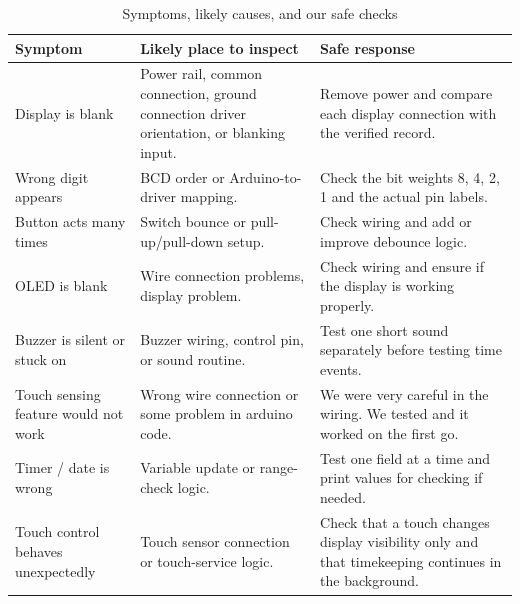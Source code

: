 \documentclass[12pt,letterpaper]{article}
\begin{document}
\begin{table}[H]

  \centering

  \caption{
  Symptoms, likely causes, and our safe checks
  }

  \label{tab:troubleshooting}

  \begin{tabularx}{
    \textwidth
  }{
    @{}p{32mm}Y Y@{}
  }

    \toprule

    \textbf{Symptom}
    &
    \textbf{Likely place to inspect}
    &
    \textbf{Safe response}
    \\

    \midrule

    Display is blank
    &
    Power rail,
    common connection, ground connection
    driver orientation,
    or blanking input.
    &
    Remove power and compare
    each display connection
    with the verified record.
    \\

    Wrong digit appears
    &
    BCD order or Arduino-to-driver mapping.
    &
    Check the bit weights
    8, 4, 2, 1
    and the actual pin labels.
    \\

    Button acts many times
    &
    Switch bounce
    or pull-up/pull-down setup.
    &
    Check wiring
    and add or improve debounce logic.
    \\

    OLED is blank
    &
    Wire connection problems, display problem.
    &
    Check wiring and ensure if the display is working properly.
    \\

    Buzzer is silent or stuck on
    &
    Buzzer wiring,
    control pin,
    or sound routine.
    &
    Test one short sound separately
    before testing time events.
    \\

    Touch sensing feature would not work
    &
    Wrong wire connection or some problem in arduino code.
    &
    We were very careful in the wiring. We tested and it worked on the first go.
    \\

    Timer / date is wrong
    &
    Variable update
    or range-check logic.
    &
    Test one field at a time
    and print values for checking if needed.
    \\

    Touch control behaves unexpectedly
    &
    Touch sensor connection or touch-service logic.
    &
    Check that a touch changes display visibility only and
    that timekeeping continues in the background.
    \\


\end{tabularx}
\end{table}
\end{document}

